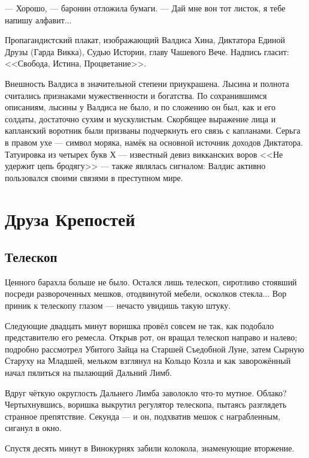 --- Хорошо, --- баронин отложила бумаги.
--- Дай мне вон тот листок, я тебе напишу алфавит...


\newpage
\thispagestyle{plain}

Пропагандистский плакат, изображающий Валдиса Хина, Диктатора Единой Друзы (Гарда Викка), Судью Истории, главу Чашевого Вече.
Надпись гласит:
<<Свобода, Истина, Процветание>>.

Внешность Валдиса в значительной степени приукрашена.
Лысина и полнота считались признаками мужественности и богатства.
По сохранившимся описаниям, лысины у Валдиса не было, и по сложению он был, как и его солдаты, достаточно сухим и мускулистым.
Скорбящее выражение лица и капланский воротник были призваны подчеркнуть его связь с капланами.
Серьга в правом ухе --- символ моряка, намёк на основной источник доходов Диктатора.
Татуировка из четырех букв Х --- известный девиз викканских воров <<Не удержит цепь бродягу>> --- также являлась сигналом: Валдис активно пользовался своими связями в преступном мире.

\chapter{Друза Крепостей}

\section{Телескоп}

Ценного барахла больше не было.
Остался лишь телескоп, сиротливо стоявший посреди развороченных мешков, отодвинутой мебели, осколков стекла...
Вор приник к телескопу глазом --- нечасто увидишь такую штуку.

Следующие двадцать минут воришка провёл совсем не так, как подобало представителю его ремесла.
Открыв рот, он вращал телескоп направо и налево;
подробно рассмотрел Убитого Зайца на Старшей Съедобной Луне, затем Сырную Старуху на Младшей, мельком взглянул на Кольцо Козла и как заворожённый начал пялиться на пылающий Дальний Лимб.

Вдруг чёткую округлость Дальнего Лимба заволокло что-то мутное.
Облако?
Чертыхнувшись, воришка выкрутил регулятор телескопа, пытаясь разглядеть странное препятствие.
Секунда --- и он, подхватив мешок с награбленным, сиганул в окно.

Спустя десять минут в Винокурнях забили колокола, знаменующие вторжение.

